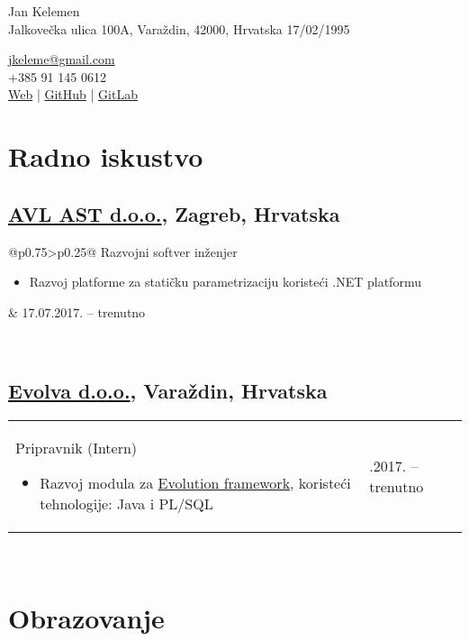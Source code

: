 \documentclass[a4paper]{article}
\makeatletter
\newlength{\tablewidth}
\newenvironment{period}[2]{%
\newcommand{\sarma}{#2}%
\setlength{\tablewidth}{\linewidth}
\addtolength{\tablewidth}{-2\tabcolsep}
\begin{tabular}{@{}p{0.75\tablewidth}>{\raggedleft\arraybackslash}p{0.25\tablewidth}@{}}%
#1 \newline
\begin{itemize}
}{%
\end{itemize} & \sarma \\%
\end{tabular}\\
}
\makeatother
\begin{document}
\fontfamily{\sfdefault}
\selectfont

\begin{minipage}{.5\textwidth}
\LARGE{Jan Kelemen}\\
\normalsize{Jalkove\v{c}ka ulica 100A, Vara\v{z}din, 42000, Hrvatska}
\normalsize{17/02/1995}
\end{minipage}%
\begin{minipage}{.5\textwidth}
\raggedleft
\href{mailto:jkeleme@gmail.com}{jkeleme@gmail.com} \\
+385 91 145 0612 \\
\href{http://jan-kelemen.github.io/}{Web} | \href{https://github.com/jan-kelemen}{GitHub} | \href{https://gitlab.com/jan-kelemen}{GitLab}
\end{minipage}

\vspace{1em}

\section{Radno iskustvo}
\subsection{\href{https://www.avl.com/}{AVL AST d.o.o.}, Zagreb, Hrvatska}
\begin{period}{Razvojni softver in\v{z}enjer}{17.07.2017. -- trenutno}
	\item
		Razvoj platforme za stati\v{c}ku parametrizaciju koriste\'{c}i .NET platformu
\end{period}
\subsection{\href{http://www.evolva.hr/hr/index.html}{Evolva d.o.o.}, Vara\v{z}din, Hrvatska}
\begin{period}{Pripravnik (Intern)}{22.08.2016. -- 23.09.2016.}
	\item
		Razvoj modula za \href{http://www.evolution-framework.com/}{Evolution framework}, koriste\'{c}i tehnologije: Java i PL/SQL
\end{period}

\section{Obrazovanje}
\end{document}
